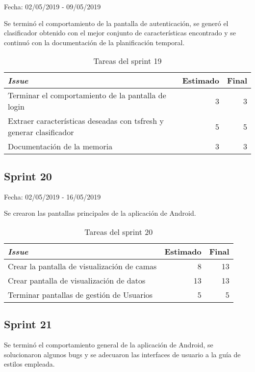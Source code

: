 Fecha: 02/05/2019 - 09/05/2019

Se terminó el comportamiento de la pantalla de autenticación, se generó el clasificador obtenido con el mejor conjunto de características encontrado y se continuó con la documentación de la planificación temporal. 

\begin{table}[H]
	\begin{tabularx}{\textwidth}{Xrr}
		\toprule \textbf{\textit{Issue}} & \textbf{Estimado} & \textbf{Final}\\
		\toprule
		Terminar el comportamiento de la pantalla de login & 3 & 3 \\
		Extraer características deseadas con tsfresh y generar clasificador & 5 & 5 \\
		Documentación de la memoria & 3 & 3 \\
		\bottomrule
	\end{tabularx}
	\caption{Tareas del sprint 19}
\end{table}

\subsection{Sprint 20}

Fecha: 02/05/2019 - 16/05/2019

Se crearon las pantallas principales de la aplicación de Android.

\begin{table}[H]
	\begin{tabularx}{\textwidth}{Xrr}
		\toprule \textbf{\textit{Issue}} & \textbf{Estimado} & \textbf{Final}\\
		\toprule
		Crear la pantalla de visualización de camas & 8 & 13 \\
		Crear pantalla de visualización de datos & 13 & 13 \\
		Terminar pantallas de gestión de Usuarios & 5 & 5 \\
		\bottomrule
	\end{tabularx}
	\caption{Tareas del sprint 20}
\end{table}

\subsection{Sprint 21}

Se terminó el comportamiento general de la aplicación de Android, se solucionaron algunos bugs y se adecuaron las interfaces de usuario a la guía de estilos empleada. 

